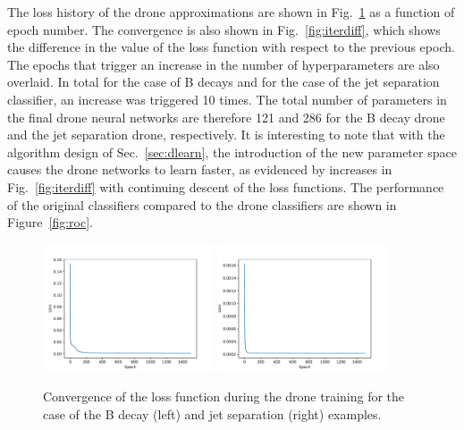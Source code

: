 \documentclass[final,5p,times,twocolumn]{elsarticle}
\begin{document}
The loss history of the drone approximations are shown in Fig.~\ref{fig:loss}
as a function of epoch number.
The convergence is also shown in Fig.~\ref{fig:iterdiff}, which shows
the difference in the value of the loss function with respect to the previous
epoch. The epochs that trigger an increase in the number of hyperparameters
are also overlaid.
In total for the case of B decays and for the case of the jet separation classifier, 
an increase was triggered 10 times.
The total number
of parameters in the final drone neural networks are therefore 121 and 286 for the B decay drone
and the jet separation drone, respectively. It is interesting
to note that with the algorithm design of Sec.~\ref{sec:dlearn}, the introduction
of the new parameter space causes the drone networks to learn faster, as evidenced by
increases in Fig.~\ref{fig:iterdiff} with continuing descent of the loss functions.
%
The performance of the original classifiers compared to the drone classifiers are shown in Figure~\ref{fig:roc}.
\begin{figure}[t]
\centering
\includegraphics[width=0.45\textwidth]{loss_history.pdf}
\includegraphics[width=0.45\textwidth]{loss_history_gpd.pdf}
\caption{\small
Convergence of the loss function during the drone training
  for the case of the B
  decay (left) and jet separation (right) examples.
}
\label{fig:loss}
\end{figure}
\end{document}

